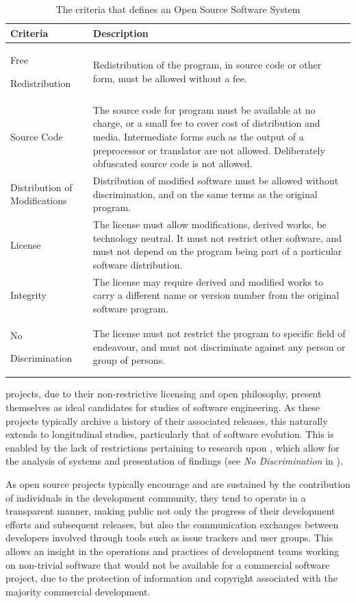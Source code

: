 \begin{table}[t]
\centering
\begin{tabular}{|p{}|p{}|}
\hline
{\bf Criteria}&{\bf Description} \\
\hline
\hline
Free \par Redistribution & Redistribution of the program, in source code or other form, must be allowed without a fee. \\
\hline
Source Code & The source code for program must be available at no charge, or a small fee to cover cost of distribution and media. Intermediate forms such as the output of a preprocessor or translator are not allowed. Deliberately obfuscated source code is not allowed. \\
\hline
Distribution of Modifications & Distribution of modified software must be allowed without discrimination, and on the same terms as the original program. \\ 
\hline
License & The license must allow modifications, derived works, be technology neutral. It must not restrict other software, and must not depend on the program being part of a particular software distribution. \\
\hline
Integrity & The license may require derived and modified works to carry a different name or version number from the original software program.  \\
\hline
No \par Discrimination & The license must not restrict the program to specific field of endeavour, and must not discriminate against any person or group of persons. \\
\hline
\end{tabular}
\vspace{0.2cm}
\caption{The criteria that defines an Open Source Software System}
\label{tab:osi_criteria}
\end{table}

{\OSS} projects, due to their non-restrictive licensing and open philosophy, present themselves as ideal candidates for studies of software engineering. As these projects typically archive a history of their associated releases, this naturally extends to longitudinal studies, particularly that of software evolution. This is enabled by the lack of restrictions pertaining to research upon \OSYS, which allow for the analysis of systems and presentation of findings (see \emph{No Discrimination} in ).

As open source projects typically encourage and are sustained by the contribution of individuals in the development community, they tend to operate in a transparent manner, making public not only the progress of their development efforts and subsequent releases, but also the communication exchanges between developers involved through tools such as issue trackers and user groups. This allows an insight in the operations and practices of development teams working on non-trivial software that would not be available for a commercial software project, due to the protection of information and copyright associated with the majority commercial development.

